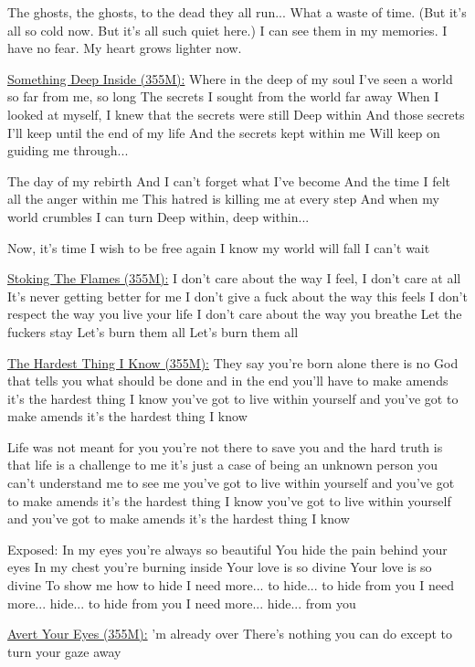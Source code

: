 \documentclass[11pt]{article}
\begin{document}
The ghosts, the ghosts, to the dead they all run...
What a waste of time.
(But it's all so cold now. But it's all such quiet here.)
I can see them in my memories.
I have no fear.
My heart grows lighter now.

\underline{Something Deep Inside (355M):}
Where in the deep of my soul
I've seen a world so far from me, so long
The secrets I sought from the world far away
When I looked at myself, I knew that the secrets were still
Deep within
And those secrets I'll keep until the end of my life
And the secrets kept within me
Will keep on guiding me through...

The day of my rebirth
And I can't forget what I've become
And the time I felt all the anger within me
This hatred is killing me at every step
And when my world crumbles I can turn
Deep within, deep within...

Now, it's time
I wish to be free again
I know my world will fall
I can't wait

\underline{Stoking The Flames (355M):}
I don't care about the way I feel, I don't care at all
It's never getting better for me
I don't give a fuck about the way this feels
I don't respect the way you live your life
I don't care about the way you breathe
Let the fuckers stay
Let's burn them all
Let's burn them all

\underline{The Hardest Thing I Know (355M):}
They say you're born alone
there is no God
that tells you what should be done
and in the end you'll have to
make amends
it's the hardest thing I know
you've got to live within yourself
and you've got to make amends
it's the hardest thing I know

Life was not meant for you
you're not there to save you
and the hard truth is
that life is a challenge to me
it's just a case of being
an unknown person
you can't understand me
to see me
you've got to live within yourself
and you've got to make amends
it's the hardest thing I know
you've got to live within yourself
and you've got to make amends
it's the hardest thing I know

Exposed:
In my eyes you're always so beautiful
You hide the pain behind your eyes
In my chest you're burning inside
Your love is so divine
Your love is so divine
To show me how to hide
I need more... to hide... to hide from you
I need more... hide... to hide from you
I need more... hide... from you

\underline{Avert Your Eyes (355M):}
'm already over
There's nothing you can do except to turn your gaze away
\end{document}
